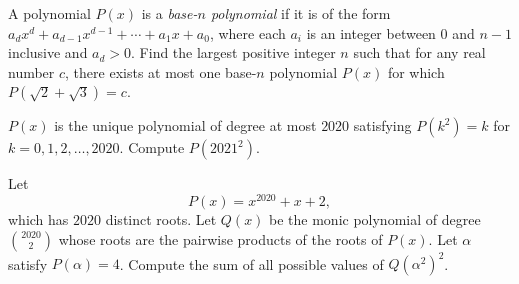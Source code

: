 %	




\begin{question}[name={2020 HMMT, Algebra \& Number Theory, \href{https://artofproblemsolving.com/community/c4p14065063}{Problem 6}}]
	A polynomial $P(x)$ is a \emph{base-$n$ polynomial} if it is of the form $a_dx^d+a_{d-1}x^{d-1}+\cdots + a_1x+a_0$, where each $a_i$ is an integer between $0$ and $n-1$ inclusive and $a_d>0$. Find the largest positive integer $n$ such that for any real number $c$, there exists at most one base-$n$ polynomial $P(x)$ for which $P(\sqrt 2+\sqrt 3)=c$.
\end{question}



%	




\begin{question}[name={2020 HMMT, Algebra \& Number Theory, \href{https://artofproblemsolving.com/community/c4p14065077}{Problem 8}}]
	$P(x)$ is the unique polynomial of degree at most $2020$ satisfying $P(k^2)=k$ for $k=0,1,2,\dots,2020$. Compute $P(2021^2)$.
\end{question}



%	





\begin{question}[name={2020 HMMT, Algebra \& Number Theory, \href{https://artofproblemsolving.com/community/c4p14065082}{Problem 9}}]
	Let $$P(x)=x^{2020}+x+2,$$ which has $2020$ distinct roots. Let $Q(x)$ be the monic polynomial of degree $\binom{2020}{2}$ whose roots are the pairwise products of the roots of $P(x)$. Let $\alpha$ satisfy $P(\alpha)=4$. Compute the sum of all possible values of $Q(\alpha^2)^2$.
\end{question}



%	




